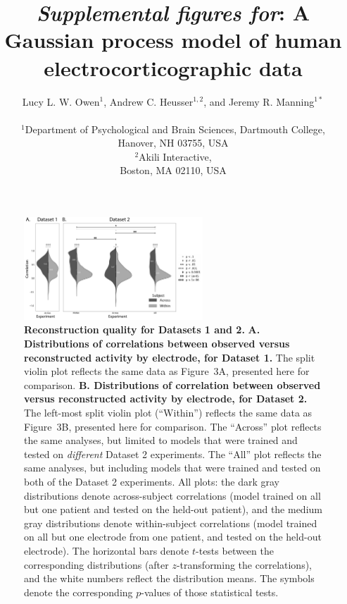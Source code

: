 \documentclass[10pt]{article}
\title{\textit{Supplemental figures for}: A Gaussian process model of human electrocorticographic data}
\author{
  Lucy L. W. Owen$^{1}$,
  Andrew C. Heusser$^{1, 2}$, and
  Jeremy R. Manning$^{1\ast}$\\\\
$^{1}$Department of Psychological and Brain Sciences, Dartmouth College,\\
Hanover, NH 03755, USA\\
$^{2}$Akili Interactive,\\
Boston, MA 02110, USA}
\begin{document}
\maketitle

\setcounter{equation}{0}
\setcounter{figure}{0}
\setcounter{table}{0}
\setcounter{page}{1}
\setcounter{section}{0}
\makeatletter
\renewcommand{\theequation}{S\arabic{equation}}
\renewcommand{\thefigure}{S\arabic{figure}}
\renewcommand{\bibnumfmt}[1]{[S#1]}
\renewcommand{\citenumfont}[1]{S#1}


\begin{figure}[b!]
\centering
\includegraphics[width=0.6\textwidth]{figs/supplemental_1}
\caption{\textbf{Reconstruction quality for Datasets 1 and 2.}
  \textbf{A. Distributions of correlations between observed versus
    reconstructed activity by electrode, for Dataset 1.} The split
  violin plot reflects the same data as Figure~3A, presented here for
  comparison.  \textbf{B. Distributions of correlation between
    observed versus reconstructed activity by electrode, for Dataset
    2.}  The left-most split violin plot (``Within'') reflects the
  same data as Figure~3B, presented here for comparison.  The
  ``Across'' plot reflects the same analyses, but limited to models
  that were trained and tested on \textit{different} Dataset 2
  experiments.  The ``All'' plot reflects the same analyses, but
  including models that were trained and tested on both of the Dataset
  2 experiments.  All plots: the dark gray distributions denote
  across-subject correlations (model trained on all but one patient
  and tested on the held-out patient), and the medium gray
  distributions denote within-subject correlations (model trained on
  all but one electrode from one patient, and tested on the held-out
  electrode).  The horizontal bars denote $t$-tests between the
  corresponding distributions (after $z$-transforming the
  correlations), and the white numbers reflect the distribution means.
  The symbols denote the corresponding $p$-values of those statistical
  tests.}
\label{fig:supplemental_1}
\end{figure}
\end{document}
